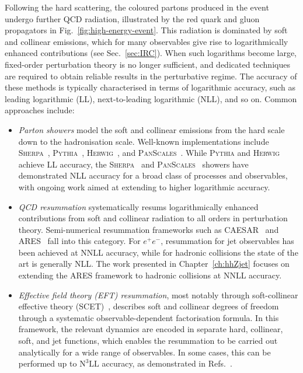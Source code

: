 Following the hard scattering, the coloured partons produced in the event undergo further QCD radiation, illustrated by the red quark and gluon propagators in Fig.~\ref{fig:high-energy-event}. This radiation is dominated by soft and collinear emissions, which for many observables give rise to logarithmically enhanced contributions (see Sec.~\ref{sec:IRC}). When such logarithms become large, fixed-order perturbation theory is no longer sufficient, and dedicated techniques are required to obtain reliable results in the perturbative regime. The accuracy of these methods is typically characterised in terms of logarithmic accuracy, such as leading logarithmic (LL), next-to-leading logarithmic (NLL), and so on. Common approaches include:
\begin{itemize}
	\item \emph{Parton showers} model the
	soft and collinear emissions from the hard scale down to the hadronisation scale. 
	Well-known implementations include \textsc{Sherpa}~\cite{Gleisberg:2008ta}, \textsc{Pythia}~\cite{Bierlich:2022pfr}, \textsc{Herwig}~\cite{Bahr:2008pv, Bellm:2015jjp}, and \textsc{PanScales}~\cite{vanBeekveld:2023ivn}. While \textsc{Pythia} and \textsc{Herwig} achieve LL accuracy, the \textsc{Sherpa}~\cite{Herren:2022jej, Sherpa:2024mfk} and \textsc{PanScales}~\cite{vanBeekveld:2022zhl, vanBeekveld:2022ukn,vanBeekveld:2023chs} showers have demonstrated NLL accuracy for a broad class of processes and observables, with ongoing work aimed at extending to higher logarithmic accuracy. 
	
\item \emph{QCD resummation} systematically resums logarithmically 
enhanced contributions from soft and collinear radiation to all 
orders in perturbation theory. Semi-numerical
resummation frameworks such as \textsc{CAESAR}~\cite{Banfi:2004yd} and \textsc{ARES}~\cite{Banfi:2014sua, Banfi:2016zlc, Banfi:2018mcq, Arpino:2019ozn} fall into this category. 
For $e^+e^-$, resummation for jet observables has been achieved at 
    NNLL accuracy, while for hadronic collisions 
    the state of the art is generally NLL. The work presented in 
    Chapter~\ref{ch:hhZjet} focuses on extending the \textsc{ARES} 
    framework to hadronic collisions at NNLL accuracy.

\item \emph{Effective field theory (EFT) resummation}, most notably through soft-collinear effective theory (SCET)~\cite{Bauer:2000ew, Bauer:2000yr, Bauer:2001ct, Bauer:2001yt}, describes soft and collinear degrees of freedom through a systematic observable-dependent factorisation formula. In this framework, the relevant dynamics are encoded in separate hard, collinear, soft, and jet functions, which enables the resummation to be carried out analytically for a wide range of observables. In some cases, this can be performed up to $\mathrm{N^3LL}$ accuracy, as demonstrated in Refs.~\cite{Becher:2008cf, Abbate:2010xh, Alioli:2023rxx}. 
	\end{itemize}

